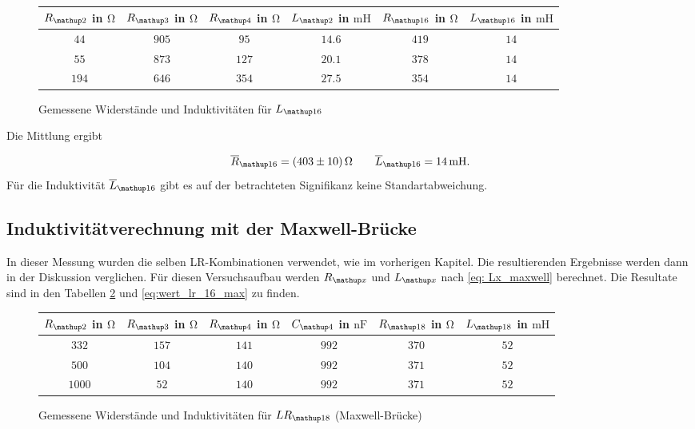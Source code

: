 \begin{figure}
\centering
\caption{Gemessene Widerstände und Induktivitäten für $L\ua{16}$}
  \label{tab:lc_r16}
\begin{tabular}{S S S S S S }
    \toprule
    {$R\ua{2}$  in $\si{\ohm}$} &  {$R\ua{3}$ in $\si{\ohm}$} & {$R\ua{4}$ in $\si{\ohm}$} & {$L\ua{2}$ in $\si{\milli\henry}$}& {$R\ua{16}$ in $\si{\ohm}$} &  {$L\ua{16}$ in $\si{\milli\henry}$} \\
    \midrule
     {$\num{44}$} & {$\num{905}$} &  {$\num{95}$}& {$\num{14,6}$}  &  {$\num{419}$} & {$\num{14}$}\\
     {$\num{55}$} & {$\num{873}$}  & {$\num{127}$} & {$\num{20,1}$} & {$\num{378}$} & {$\num{14}$}\\
     {$\num{194}$} & {$\num{646}$}  & {$\num{354}$} & {$\num{27,5}$} &{$\num{354}$} & {$\num{14}$}  \\
    \bottomrule
  \end{tabular}
 \end{figure}

Die Mittlung ergibt

\begin{equation}
\label{eq:wert_r16_l_16}
\overline{R}_{\map{16}}=\SI{403\pm10}{\ohm} \qquad \overline{L}_{\map{16}}=\SI{14}{\milli\henry}.
\end{equation}
Für die Induktivität $\overline{L}_{\map{16}}$ gibt es auf der betrachteten Signifikanz keine 
Standartabweichung.

\subsection{Induktivitätverechnung mit der Maxwell-Brücke}

In dieser Messung wurden die selben LR-Kombinationen verwendet, wie 
im vorherigen Kapitel.
Die resultierenden Ergebnisse werden dann in der Diskussion verglichen.
Für diesen Versuchsaufbau werden $R\ua{x}$ und $L\ua{x}$ nach \eqref{eq: Lx_maxwell} berechnet.
Die Resultate sind in den Tabellen \ref{tab:lc_r18_max} und \ref{eq:wert_lr_16_max} zu finden.

\begin{figure}
\centering
\caption{Gemessene Widerstände und Induktivitäten für $LR\ua{18}$ (Maxwell-Brücke)}
  \label{tab:lc_r18_max}
\begin{tabular}{S S S S S S }
    \toprule
    {$R\ua{2}$  in $\si{\ohm}$} &  {$R\ua{3}$ in $\si{\ohm}$} & {$R\ua{4}$ in $\si{\ohm}$} & {$C\ua{4}$ in $\si{\nano\farad}$}& {$R\ua{18}$ in $\si{\ohm}$} &  {$L\ua{18}$ in $\si{\milli\henry}$} \\
    \midrule
     {$\num{332}$} & {$\num{157}$} &  {$\num{141}$}& {$\num{992}$}  &  {$\num{370}$} & {$\num{52}$}\\
     {$\num{500}$} & {$\num{104}$}  & {$\num{140}$} & {$\num{992}$} & {$\num{371}$} & {$\num{52}$}\\
     {$\num{1000}$} & {$\num{52}$}  & {$\num{140}$} & {$\num{992}$} &{$\num{371}$} & {$\num{52}$}  \\
    \bottomrule
  \end{tabular}
 \end{figure}


